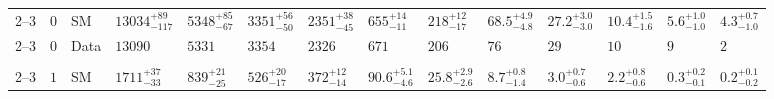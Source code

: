 \begin{landscape}
\begin{center}
\begin{table}[h!]
\begin{tabular}{ llllllllllllll }
    \hline
    2--3                 & $0$      & SM   & $13034^{+89}_{-117}$           & $5348^{+85}_{-67}$             & $3351^{+56}_{-50}$             & $2351^{+38}_{-45}$             & $655^{+14}_{-11}$              & $218^{+12}_{-17}$              & $68.5^{+4.9}_{-4.8}$           & $27.2^{+3.0}_{-3.0}$           & $10.4^{+1.5}_{-1.6}$           & $5.6^{+1.0}_{-1.0}$            & $4.3^{+0.7}_{-1.0}$            \\ 
    2--3                 & $0$      & Data & $13090$                        & $5331$                        & $3354$                         & $2326$                         & $671$                          & $206$                          & $76$                           & $29$                           & $10$                           & $9$                            & $2$                            \\\\
    2--3                 & $1$      & SM   & $1711^{+37}_{-33}$             & $839^{+21}_{-25}$              & $526^{+20}_{-17}$              & $372^{+12}_{-14}$              & $90.6^{+5.1}_{-4.6}$           & $25.8^{+2.9}_{-2.6}$           & $8.7^{+0.8}_{-1.4}$            & $3.0^{+0.7}_{-0.6}$            & $2.2^{+0.8}_{-0.6}$            & $0.3^{+0.2}_{-0.1}$            & $0.2^{+0.1}_{-0.2}$            \\ 

\end{tabular}
\end{table}
\end{center}
\end{landscape}
